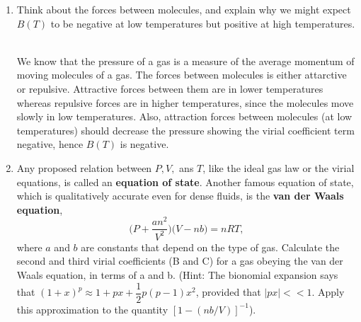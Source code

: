 \documentclass[fleqn]{article}
\begin{document}
\begin{enumerate}
\begin{enumerate}
      \item Think about the forces between molecules, and explain why we might expect $B(T)$ to be negative at low temperatures but positive 
      at high temperatures.

        \textcolor{hwColor}{
          \\
          We know that the pressure of a gas is a measure of the average momentum of moving molecules of a gas. The forces between
          molecules is either attarctive or repulsive. Attractive forces between them are in lower temperatures whereas repulsive forces
          are in higher temperatures, since the molecules move slowly in low temperatures. Also, attraction forces between
          molecules (at low temperatures) should decrease the pressure showing the virial coefficient term negative, hence $B(T)$ is negative.  
        }

      \item Any proposed relation between $P, V,$ ans $T$, like the ideal gas law or the virial equations, is called an \textbf{equation of state}.
      Another famous equation of state, which is qualitatively accurate even for dense fluids, is the \textbf{van der Waals equation},
      $$
        \bigg(P+\dfrac{an^2}{V^2}\bigg) \bigg(V-nb\bigg)=nRT,
      $$
      where $a$ and $b$ are constants that depend on the type of gas. Calculate the second and third virial coefficients (B and C) for a gas
      obeying the van der Waals equation, in terms of a and b. (Hint: The bionomial expansion says that 
      $(1+x)^p \approx 1+px+\dfrac{1}{2} p(p-1) x^2$, provided that $|px|<<1$. Apply this approximation to the quantity 
      $\left[1-(nb/V)\right]^{-1}$).


\end{enumerate}
\end{enumerate}
\end{document}
